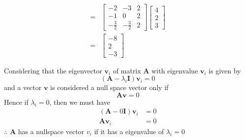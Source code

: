 \documentclass[12pt]{article}
\newcommand{\matr}[1]{\mathbf{#1}}
\newenvironment{question}[2][Question]{\begin{trivlist}
    \item[\hskip \labelsep {\bfseries #1}\hskip \labelsep {\bfseries #2.}]}{\end{trivlist}}
\begin{document}
\begin{align}
	= & \left[\begin{matrix}-2 & -3 & 2  \\-1 & 0 & 2\\- \frac{3}{2} & - \frac{3}{2} & 2\end{matrix}\right]	\left[\begin{matrix}4\\2\\3\end{matrix}\right] \\
	=&\left[\begin{matrix}-8\\2\\-3\end{matrix}\right]
\end{align}

\begin{question}{Q. 3}\end{question}
Considering that the eigenvector $\matr v_i$ of matrix $\matr A$ with eigenvalue $\matr v_i$ is given by
\begin{equation}
	\left(\matr A - \lambda_i \matr I \right)\matr v_i = 0 
\end{equation}
and a vector $\matr v$ is considered a null space vector only if
\begin{equation}
	\matr A \matr v = 0
\end{equation}
Hence if $\lambda_i = 0$, then we must have
\begin{align}
	(\matr A - 0 \matr I) \matr v _i & = 0 \\
	\matr A \matr v _ i              & = 0 
\end{align}
$\therefore$ $\matr A$ has a nullspace vector $v_i$ if it has a eigenvalue of $\lambda _i=0$\\ \\
\end{document}
